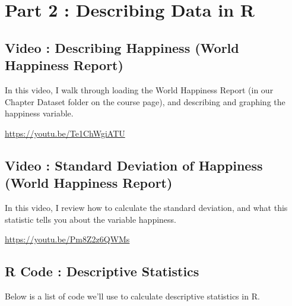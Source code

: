 \documentclass[
  letterpaper,
  DIV=11,
  numbers=noendperiod,
  oneside]{scrreprt}
\begin{document}
\chapter{Part 2 : Describing Data in
R}\label{part-2-describing-data-in-r}

\section{Video : Describing Happiness (World Happiness
Report)}\label{video-describing-happiness-world-happiness-report}

In this video, I walk through loading the World Happiness Report (in our
Chapter Dataset folder on the course page), and describing and graphing
the happiness variable.

\url{https://youtu.be/Te1ChWgiATU}

\section{Video : Standard Deviation of Happiness (World Happiness
Report)}\label{video-standard-deviation-of-happiness-world-happiness-report}

In this video, I review how to calculate the standard deviation, and
what this statistic tells you about the variable happiness.

\url{https://youtu.be/Pm8Z2z6QWMs}

\section{R Code : Descriptive
Statistics}\label{r-code-descriptive-statistics}

Below is a list of code we'll use to calculate descriptive statistics in
R.
\end{document}
